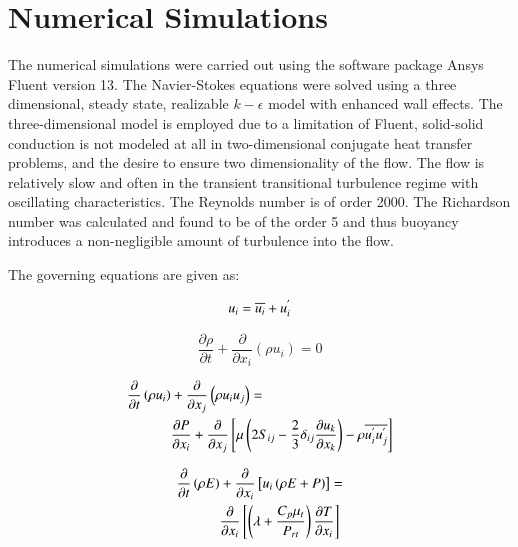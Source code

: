 \documentclass[preprint,12pt]{elsarticle}
\begin{document}
\section{Numerical Simulations}

The numerical simulations were carried out using the software package Ansys Fluent version 13\cite{fluentsoftware}.  The Navier-Stokes equations were solved using a three dimensional, steady state, realizable $k-\epsilon$ model with enhanced wall effects.  The three-dimensional model is employed due to a limitation of Fluent, solid-solid conduction is not modeled at all in two-dimensional conjugate heat transfer problems, and the desire to ensure two dimensionality of the flow.  The flow is relatively slow and often in the transient transitional turbulence regime with oscillating characteristics.  The Reynolds number is of order 2000.  The Richardson number was calculated and found to be of the order 5 and thus buoyancy introduces a non-negligible amount of turbulence into the flow.



The governing equations are given as:

\begin{equation}
\centering
u_i = \overline{u_i} + u^{'}_{i}
\label{eq:veldecomp}
\end{equation}

\begin{equation}
\frac{\partial \rho }{\partial t } + \frac{\partial }{\partial x_i} \left( \rho u_i \right) = 0 
\label{eq:mass}
\end{equation}

\begin{equation}
\centering
\begin{split}
\frac{\partial }{\partial t} \left( \rho u_i \right) &+ \frac{\partial }{\partial x_j } \left( \rho u_i u_j \right) = \\
 &\frac{\partial P}{\partial x_i } + \frac{\partial }{\partial x_j } \left[ \mu \left( 2 S_{ij} - \frac{2}{3} \delta_{ij} \frac{\partial u_k }{\partial x_k } \right) - \rho \overline{u^{'}_{i} u^{'}_{j}} \right] 
\label{eq:momentum}
\end{split}
\end{equation}

\begin{equation}
\centering
\begin{split}
\frac{\partial }{\partial t } \left( \rho E \right) &+ \frac{\partial }{\partial x_i} \left[ u_i \left( \rho E + P \right) \right] = \\
 &\frac{\partial }{\partial x_i } \left[ \left( \lambda + \frac{C_p \mu_t }{P_{rt}} \right) \frac{\partial T}{\partial x_i} \right] 
\label{eq:energy}
\end{split}
\end{equation}
\end{document}
